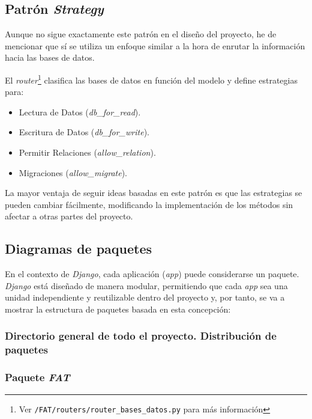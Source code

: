 \subsection{Patrón \emph{Strategy}}

Aunque no sigue exactamente este patrón en el diseño del proyecto, he de mencionar que sí se utiliza un enfoque similar a la hora de enrutar la información hacia las bases de datos. 

El \emph{router}\footnote{Ver \texttt{/FAT/routers/router\_bases\_datos.py} para más información} clasifica las bases de datos en función del modelo y define estrategias para:

\begin{itemize}
\tightlist
\item 
Lectura de Datos (\emph{db\_for\_read}).
\item 
Escritura de Datos (\emph{db\_for\_write}).
\item 
Permitir Relaciones (\emph{allow\_relation}).
\item
Migraciones (\emph{allow\_migrate}).
\end{itemize}

La mayor ventaja de seguir ideas basadas en este patrón es que las estrategias se pueden cambiar fácilmente, modificando la implementación de los métodos sin afectar a otras partes del proyecto. 


\subsection{Diagramas de paquetes}

En el contexto de \emph{Django}, cada aplicación (\emph{app}) puede considerarse un paquete. \emph{Django} está diseñado de manera modular, permitiendo que cada \emph{app} sea una unidad independiente y reutilizable dentro del proyecto y, por tanto, se va a mostrar la estructura de paquetes basada en esta concepción:

\newpage
\subsubsection{Directorio general de todo el proyecto. Distribución de paquetes}



\subsubsection{Paquete \emph{FAT}}



